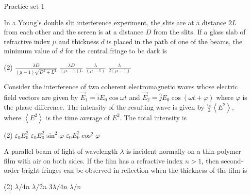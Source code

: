 \newpage
\begin{abox}
	Practice set 1 
	\end{abox}
\begin{enumerate}
	\begin{minipage}{\textwidth}
		\item In a Young's double slit interference experiment, the slits are at a distance $2 L$ from each other and the screen is at a distance $D$ from the slits. If a glass slab of refractive index $\mu$ and thickness $d$ is placed in the path of one of the beams, the minimum value of $d$ for the central fringe to be dark is
	\end{minipage}
	\begin{tasks}(2)
		\task[\textbf{A.}] $\frac{\lambda D}{(\mu-1) \sqrt{D^{2}+L^{2}}}$
		\task[\textbf{B.}] $\frac{\lambda D}{(\mu-1) L}$
		\task[\textbf{C.}]$\frac{\lambda}{(\mu-1)}$
		\task[\textbf{D.}]$\frac{\lambda}{2(\mu-1)}$
	\end{tasks}
\begin{minipage}{\textwidth}
	\item Consider the interference of two coherent electromagnetic waves whose electric field vectors are given by $\vec{E}_{1}=\hat{i} E_{0} \cos \omega t$ and $\vec{E}_{2}=\hat{j} E_{0} \cos (\omega t+\varphi)$ where $\varphi$ is the phase difference. The intensity of the resulting wave is given by $\frac{\varepsilon_{0}}{2}\left\langle E^{2}\right\rangle$, where $\left\langle E^{2}\right\rangle$ is the time average of $E^{2}$. The total intensity is
\end{minipage}
\begin{tasks}(2)
	\task[\textbf{B.}]$\varepsilon_{0} E_{0}^{2}$
	\task[\textbf{C.}] $\varepsilon_{0} E_{0}^{2} \sin ^{2} \varphi$
	\task[\textbf{D.}] $\varepsilon_{0} E_{0}^{2} \cos ^{2} \varphi$
\end{tasks}
\begin{minipage}{\textwidth}
	\item A parallel beam of light of wavelength $\lambda$ is incident normally on a thin polymer film with air on both sides. If the film has a refractive index $n>1$, then second-order bright fringes can be observed in reflection when the thickness of the film is
\end{minipage}
\begin{tasks}(2)
	\task[\textbf{A.}] $\lambda / 4 n$
	\task[\textbf{B.}]$\lambda / 2 n$
	\task[\textbf{C.}]$3 \lambda / 4 n$
	\task[\textbf{D.}] $\lambda / n$

\end{tasks}
\end{enumerate}
